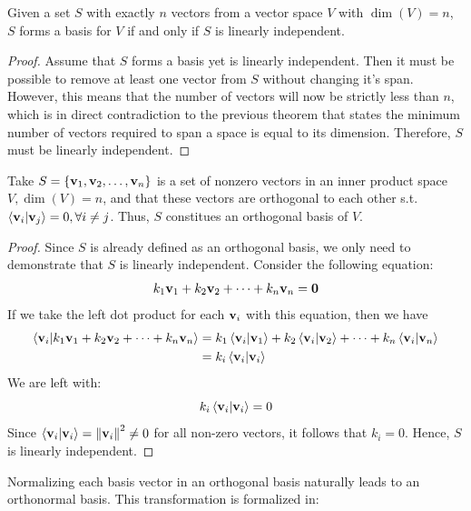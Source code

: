 \documentclass[12pt]{article}
\begin{document}
\begin{theorem}
    Given a set $S$ with exactly $n$ vectors from a vector space $V$ with $\dim(V) = n$, $S$ forms a basis for $V$ if and only if $S$ is linearly independent. 
\end{theorem}

\begin{proof}
    Assume that $S$ forms a basis yet is linearly independent. Then it must be possible to remove at least one vector from $S$ without changing it's span. However, this means that the number of vectors will now be strictly less than $n$, which is in direct contradiction to the previous theorem that states the minimum number of vectors required to span a space is equal to its dimension. Therefore, $S$ must be linearly independent. 
\end{proof}

\begin{theorem}
    Take $S = \left\{\mathbf{v}_1, \mathbf{v}_2, \ldots, \mathbf{v}_n\right\}$ is a set of nonzero vectors in an inner product space $V, \dim(V) = n$, and that these vectors are orthogonal to each other s.t. $\braket{\mathbf{v}_i}{\mathbf{v}_j} = 0, \forall i \neq j$. Thus, $S$ constitues an orthogonal basis of $V$. 
\end{theorem}

\begin{proof}
    Since $S$ is already defined as an orthogonal basis, we only need to demonstrate that $S$ is linearly independent. Consider the following equation:
    $$k_1 \mathbf{v}_1 + k_2 \mathbf{v}_2 + \cdots + k_n \mathbf{v}_n = \mathbf{0}$$
    If we take the left dot product for each $\mathbf{v}_i$ with this equation, then we have 
    \begin{align*}
        \braket{\mathbf{v}_i}{k_1 \mathbf{v}_1 + k_2 \mathbf{v}_2 + \cdots + k_n \mathbf{v}_n} &= k_1 \braket{\mathbf{v}_i}{\mathbf{v}_1} + k_2 \braket{\mathbf{v}_i}{\mathbf{v}_2} + \cdots + k_n \braket{\mathbf{v}_i}{\mathbf{v}_n} \\
        &= k_i \braket{\mathbf{v}_i}{\mathbf{v}_i} \\
    \end{align*}
    We are left with:
    $$k_i \braket{\mathbf{v}_i}{\mathbf{v}_i} = 0$$
    Since $\braket{\mathbf{v}_i}{\mathbf{v}_i} = \norm{\mathbf{v}_i}^2 \neq 0$ for all non-zero vectors, it follows that $k_i = 0$. Hence, $S$ is linearly independent.
\end{proof}

Normalizing each basis vector in an orthogonal basis naturally leads to an orthonormal basis. This transformation is formalized in:
\end{document}

